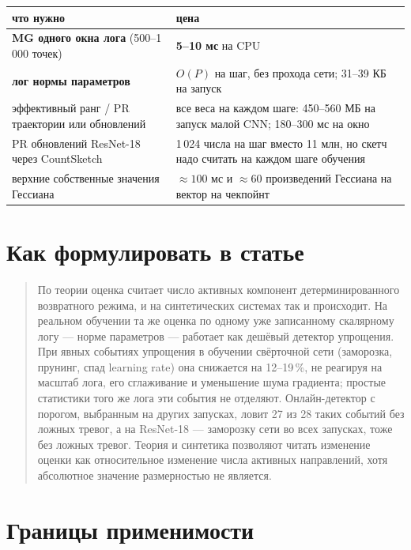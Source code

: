 \documentclass[10pt,a4paper]{article}
\begin{document}
\begin{center}\small
\begin{tabular}{p{7.2cm}p{8.6cm}}\toprule
что нужно & цена\\\midrule
\textbf{MG одного окна лога} (500--1\,000 точек) & \textbf{5--10 мс} на CPU\\
\textbf{лог нормы параметров} & $O(P)$ на шаг, без прохода сети; 31--39 КБ на запуск\\
эффективный ранг / PR траектории или обновлений & все веса на каждом шаге: 450--560 МБ на запуск малой CNN; 180--300 мс на окно\\
PR обновлений ResNet-18 через CountSketch & 1\,024 числа на шаг вместо 11 млн, но скетч надо считать на каждом шаге обучения\\
верхние собственные значения Гессиана & $\approx 100$ мс и $\approx 60$ произведений Гессиана на вектор на чекпойнт\\
\bottomrule\end{tabular}
\end{center}

\section{Как формулировать в статье}

\begin{quote}
По теории оценка считает число активных компонент детерминированного возвратного
режима, и на синтетических системах так и происходит. На реальном обучении та же
оценка по одному уже записанному скалярному логу --- норме параметров --- работает
как дешёвый детектор упрощения. При явных событиях упрощения в обучении свёрточной
сети (заморозка, прунинг, спад learning rate) она снижается на 12--19\,\%, не
реагируя на масштаб лога, его сглаживание и уменьшение шума градиента; простые
статистики того же лога эти события не отделяют. Онлайн-детектор с порогом,
выбранным на других запусках, ловит 27 из 28 таких событий без ложных тревог, а на
ResNet-18 --- заморозку сети во всех запусках, тоже без ложных тревог. Теория и
синтетика позволяют читать изменение оценки как относительное изменение числа
активных направлений, хотя абсолютное значение размерностью не является.
\end{quote}

\section{Границы применимости}
\end{document}
